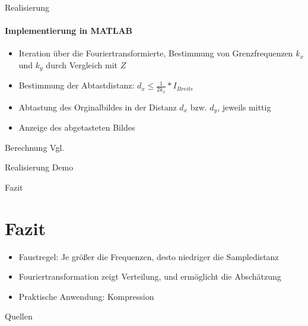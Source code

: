 \documentclass{beamer}
\begin{document}
	\begin{frame}{Realisierung}
	\framesubtitle{Implementierung in MATLAB}
	\begin{itemize}
	\item Iteration über die Fouriertransformierte, Bestimmung von Grenzfrequenzen $k_x$ und $k_y$ durch Vergleich mit $Z$
	\item Bestimmung der Abtastdistanz: $d_x\leq \frac{1}{2k_x}*I_{Breite}$
	\item Abtastung des Orginalbildes in der Distanz $d_x$ bzw. $d_y$, jeweils mittig
	\item Anzeige des abgetasteten Bildes
	\end{itemize}
	Berechnung Vgl. \cite{dip}
	\end{frame}
	\begin{frame}{Realisierung}
	Demo
	\end{frame}
	\begin{frame}{Fazit}
	\section{Fazit}
	\begin{itemize}
		\item Faustregel: Je größer die Frequenzen, desto niedriger die Sampledistanz
		\item Fouriertransformation zeigt Verteilung, und ermöglicht die Abschätzung
		\item Praktische Anwendung: Kompression
	\end{itemize}
	\end{frame}
	
	\begin{frame}{Quellen}
		\begin{multicols}{2}
		\tiny{
			
			
		}
		\end{multicols}
	\end{frame}
	
\end{document}
